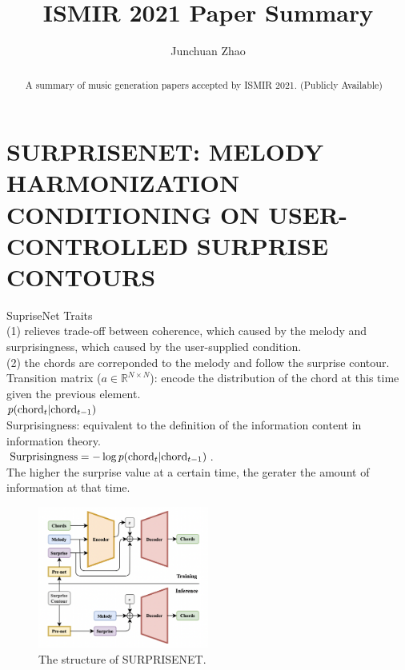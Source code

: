 \documentclass{article}
\title{ISMIR 2021 Paper Summary}
\author{Junchuan Zhao}
\begin{document}
\maketitle

\begin{abstract}
A summary of music generation papers accepted by ISMIR 2021. (Publicly Available)
\end{abstract}

\section{SURPRISENET: MELODY HARMONIZATION CONDITIONING ON USER-CONTROLLED SURPRISE CONTOURS}
SupriseNet Traits\\
(1) relieves trade-off between coherence, which caused by the melody and surprisingness, which caused by the user-supplied condition.\\
(2) the chords are correponded to the melody and follow the surprise contour.\\

\noindent
Transition matrix ($a \in \mathbb{R}^{N \times N}$): encode the distribution of the chord at this time given the previous element.\\
$p({\rm chord}_t|{\rm chord}_{t-1})$\\

\noindent
Surprisingness: equivalent to the definition of the information content in information theory.\\
${\rm Surprisingness} = -\log{p({\rm chord}_t|{\rm chord}_{t-1})}$.\\
The higher the surprise value at a certain time, the gerater the amount of information at that time.\\

\noindent
\begin{figure}[H]
	\centerline{
   \includegraphics[width=0.5\textwidth]{Fig1.png}}
   \caption{The structure of SURPRISENET.}
   \label{fig:example}
\end{figure}
\end{document}

